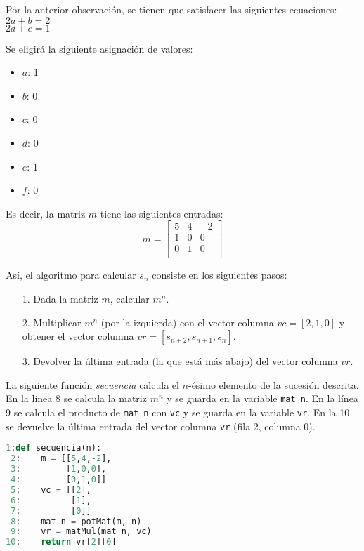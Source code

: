 \documentclass{article}
\begin{document}
Por la anterior observación, se tienen que satisfacer las siguientes ecuaciones:\\
$2a+b = 2$\\
$2d+e = 1$

Se eligirá la siguiente asignación de valores:
\begin{itemize}
\item $a$: 1
\item $b$: 0
\item $c$: 0
\item $d$: 0
\item $e$: 1
\item $f$: 0
\end{itemize}

Es decir, la matriz $m$ tiene las siguientes entradas:
\[
m =
\begin{bmatrix}
5 & 4 & -2 \\
1 & 0 & 0 \\
0 & 1 & 0 \\
\end{bmatrix}
\]

Así, el algoritmo para calcular $s_n$ consiste en los siguientes pasos:

\begin{itemize}
\item[1.] Dada la matriz $m$, calcular $m^n$.
\item[2.] Multiplicar $m^n$ (por la izquierda) con el vector columna $vc = [2, 1, 0]$ y obtener el vector columna $vr = [s_{n+2}, s_{n+1}, s_n]$.
\item[3.] Devolver la última entrada (la que está más abajo) del vector columna $vr$.
\end{itemize}

La siguiente función \textit{secuencia} calcula el $n$-ésimo elemento de la sucesión descrita. En la línea 8 se calcula la matriz $m^n$ y se guarda en la variable \texttt{mat\_n}. En la línea 9 se calcula el producto de \texttt{mat\_n} con \texttt{vc} y se guarda en la variable \texttt{vr}. En la 10 se devuelve la última entrada del vector columna \texttt{vr} (fila 2, columna 0).

\begin{lstlisting}[language=Python]
 1:def secuencia(n):
 2:    m = [[5,4,-2],
 3:         [1,0,0],
 4:         [0,1,0]]
 5:    vc = [[2],
 6:          [1],
 7:          [0]]
 8:    mat_n = potMat(m, n)
 9:    vr = matMul(mat_n, vc)
10:    return vr[2][0]
\end{lstlisting}
\end{document}
